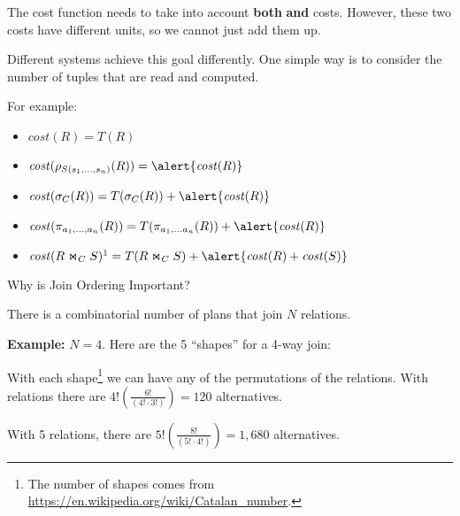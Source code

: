 \begin{frame}

The \alert{cost function} needs to take into account \textbf{both}  \textbf{and}  costs. However, these two costs have different units, so we cannot just add them up.

Different systems achieve this goal differently. One simple way is to consider the number of tuples that are read and computed. 

For example:

\begin{itemize}[-,topsep=-0.5em,noitemsep]
\item $\mathit{cost}(R) = T(R)$
\item $\mathit{cost}(\rho_{S(s_1,\ldots,s_n)}(R)) = \alert{\mathit{cost}(R)}$
\item $\mathit{cost}(\sigma_C(R)) = T(\sigma_C(R)) + \alert{\mathit{cost}(R)}$
\item $\mathit{cost}(\pi_{a_1,\ldots,a_n}(R)) = T(\pi_{a_1,\ldots a_n}(R)) + \alert{\mathit{cost}(R)}$
\item $\mathit{cost}(R\Join_C S)\blue{\footnotemark} = T(R \Join_C S) + \alert{\mathit{cost}(R)+\mathit{cost}(S)}$ 
\end{itemize}

\end{frame}

%
\begin{frame}{Why is Join Ordering Important?}

There is a combinatorial number of plans that join $N$ relations. 

\textbf{Example:} $N=4$. Here are the 5 ``shapes'' for a 4-way join:

\begin{center}
\end{center}

With each shape\footnote{The number of shapes comes from \url{https://en.wikipedia.org/wiki/Catalan_number}.} we can have any of the permutations of the relations. With relations there are $4!(\frac{6!}{(4! \cdot 3!)})=120$ alternatives. 

With 5 relations, there are $5!(\frac{8!}{(5! \cdot 4!)})=1,680$ alternatives.

\end{frame}

